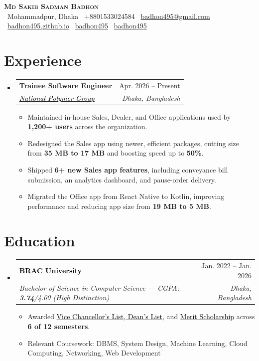\documentclass[a4paper,11pt]{article}
\makeatletter
\newcommand{\resumeItem}[1]{
  \item\small{
    {#1 \vspace{-2pt}}
  }
}
\newcommand{\resumeSubheading}[4]{
  \vspace{-2pt}\item
    \begin{tabular*}{0.97\textwidth}[t]{l@{\extracolsep{\fill}}r}
      \textbf{#1} & #2 \\
      \textit{\small#3} & \textit{\small #4} \\
    \end{tabular*}\vspace{-7pt}
}
\newcommand{\resumeSubHeadingListStart}{\begin{itemize}[leftmargin=0.15in, label={}]}
\newcommand{\resumeSubHeadingListEnd}{\end{itemize}}
\newcommand{\resumeItemListStart}{\begin{itemize}}
\newcommand{\resumeItemListEnd}{\end{itemize}\vspace{-5pt}}
\makeatother
\begin{document}
\begin{center}
    \textbf{\Huge \scshape Md Sakib Sadman Badhon} \\ \vspace{4pt}
    \small
    \faMapMarker*~Mohammadpur, Dhaka \enspace
    ~+8801533024584 \enspace
    \faEnvelope~\href{mailto:badhon495@gmail.com}{badhon495@gmail.com} \enspace
    \faGlobe~\href{https://badhon495.github.io/}{badhon495.github.io} \enspace
    \faLinkedin~\href{https://linkedin.com/in/badhon495/}{badhon495} \enspace
    \faGithub~\href{https://github.com/badhon495}{badhon495}
\end{center}




\section{Experience}
  \resumeSubHeadingListStart

    \resumeSubheading
      {Trainee Software Engineer}{Apr. 2026 -- Present}
      {\href{https://www.nationalpolymer.net/}{\textcolor{black}{National Polymer Group}}}{Dhaka, Bangladesh}
      \resumeItemListStart
        \resumeItem{Maintained in-house Sales, Dealer, and Office applications used by \textbf{1,200+ users} across the organization.}
        \resumeItem{Redesigned the Sales app using newer, efficient packages, cutting size from \textbf{35 MB to 17 MB} and boosting speed up to \textbf{50\%}.}
        \resumeItem{Shipped \textbf{6+ new Sales app features}, including conveyance bill submission, an analytics dashboard, and pause-order delivery.}
        \resumeItem{Migrated the Office app from React Native to Kotlin, improving performance and reducing app size from \textbf{19 MB to 5 MB}.}
      \resumeItemListEnd

  \resumeSubHeadingListEnd




\section{Education}
  \resumeSubHeadingListStart
    \resumeSubheading
      {\href{https://www.bracu.ac.bd/}{\textcolor{black}{BRAC University}}}{Jan. 2022 -- Jan. 2026}
      {Bachelor of Science in Computer Science --- CGPA: \textbf{3.74}/4.00 (High Distinction)}{Dhaka, Bangladesh}
      \resumeItemListStart
        \resumeItem{Awarded \href{https://www.bracu.ac.bd/academics/policies-and-procedures/academic-standings-and-honors}{\textcolor{black}{Vice Chancellor's List, Dean's List}}, and \href{https://www.bracu.ac.bd/admissions/international-applicants/scholarship-financial-aid}{\textcolor{black}{Merit Scholarship}} across \textbf{6 of 12 semesters}.}
        \resumeItem{Relevant Coursework: DBMS, System Design, Machine Learning, Cloud Computing, Networking, Web Development}
      \resumeItemListEnd
  \resumeSubHeadingListEnd
\end{document}
